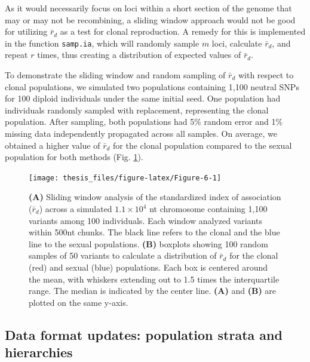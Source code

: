 \documentclass[double,12pt]{beavtex}
\begin{document}
  As it would necessarily focus on loci within a short section of the
  genome that may or may not be recombining, a sliding window approach
  would not be good for utilizing \(\bar{r}_d\) as a test for clonal
  reproduction. A remedy for this is implemented in the function
  \texttt{samp.ia}, which will randomly sample \(m\) loci, calculate
  \(\bar{r}_d\), and repeat \(r\) times, thus creating a distribution of
  expected values of \(\bar{r}_d\).
  
  To demonstrate the sliding window and random sampling of \(\bar{r}_d\)
  with respect to clonal populations, we simulated two populations
  containing 1,100 neutral SNPs for 100 diploid individuals under the same
  initial seed. One population had individuals randomly sampled with
  replacement, representing the clonal population. After sampling, both
  populations had 5\% random error and 1\% missing data independently
  propagated across all samples. On average, we obtained a higher value of
  \(\bar{r}_d\) for the clonal population compared to the sexual
  population for both methods (Fig. \ref{fig:Figure-6}).
  
  \begin{figure}
  
  {\centering \texttt{[image: thesis\_files/figure-latex/Figure-6-1]} 
  
  }
  
  \caption[Sliding window analysis of the standardized index of association
  (\(\bar{r}_d\))]{\textbf{(A)} Sliding window analysis of the standardized index of
  association (\(\bar{r}_d\)) across a simulated \(1.1 \times 10^4\) nt
  chromosome containing 1,100 variants among 100 individuals. Each window
  analyzed variants within 500nt chunks. The black line refers to the
  clonal and the blue line to the sexual populations. \textbf{(B)}
  boxplots showing 100 random samples of 50 variants to calculate a
  distribution of \(\bar{r}_d\) for the clonal (red) and sexual (blue)
  populations. Each box is centered around the mean, with whiskers
  extending out to 1.5 times the interquartile range. The median is
  indicated by the center line. \textbf{(A)} and \textbf{(B)} are plotted
  on the same y-axis.}\label{fig:Figure-6}
  \end{figure}
  
  \subsection{Data format updates: population strata and
  hierarchies}\label{data-format-updates-population-strata-and-hierarchies}
  
\end{document}

